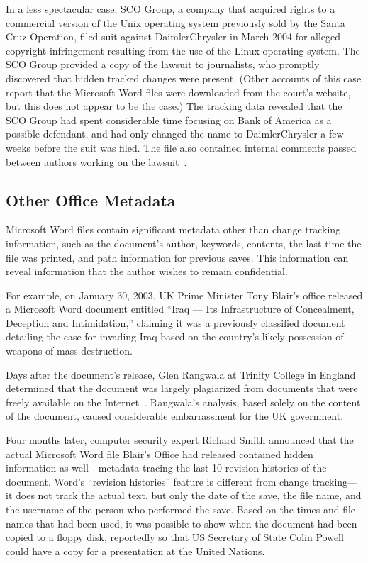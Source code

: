 In a less spectacular case, SCO Group, a company that acquired rights
to a commercial version of the Unix
operating system previously sold by the Santa Cruz Operation, filed
suit against DaimlerChrysler in March 2004 for alleged copyright infringement
resulting from the use of the Linux operating system. The SCO Group provided a copy of the lawsuit to
journalists, who
promptly discovered that hidden tracked changes were present. (Other accounts of this case
  report that the Microsoft Word files were downloaded from the
  court's website, but this does not appear to be the case.) The
tracking data revealed that the SCO Group had spent considerable time focusing on Bank of America as a
possible defendant, and had only changed the name to DaimlerChrysler a
few weeks before the suit was filed. The file also contained internal
comments passed between authors working on the
lawsuit~\cite{sco-hidden-text}.



\subsection{Other Office Metadata}

Microsoft Word files contain significant metadata other than change
tracking information, such as the document's author, keywords,
contents, the last time the file was printed, and path information for
previous saves. This information can reveal information that the
author wishes to remain confidential.

For example, on January 30, 2003,  UK Prime Minister Tony Blair's office released a Microsoft Word document entitled ``Iraq --- Its
Infrastructure of Concealment, Deception and Intimidation,'' claiming
it was a previously classified document detailing the case
for invading Iraq based on the country's likely possession of weapons
of mass destruction. 

Days after the document's release, Glen Rangwala at
Trinity College in England determined that the document was largely
plagiarized from documents that were freely available on the
Internet~\cite{rangwala-2003}.  Rangwala's analysis, based solely on
the content of the document, caused considerable embarrassment for the
UK government.

Four months later, computer security expert Richard Smith
announced that the actual Microsoft Word file Blair's Office had
released contained hidden information as well---metadata tracing the
last 10 revision histories of the document. Word's ``revision
histories'' feature is different from change tracking---it does not
track the actual text, but only the date of the save, the file name,
and the username of the person who performed the save. Based on the
times and file names that had been used, it was possible to show when
the document had been copied to a floppy
disk, reportedly so that US Secretary of State Colin Powell could have
a copy for a presentation at the United Nations\cite{smith-10}.

